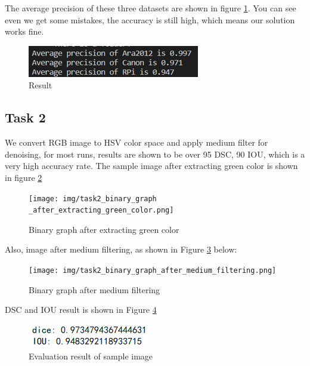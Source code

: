 \documentclass[conference]{IEEEtran}
\begin{document}
The average precision of these three datasets are shown in figure \ref{task1_eva}. You can see even we get some mistakes, the accuracy is still high, which means our solution works fine.


\begin{figure}[h!]
\centering
\includegraphics[width=0.7\linewidth]{img/task1_eva.png}
\caption{Result}
\label{task1_eva}
\end{figure}

\subsection{Task 2}
We convert RGB image to HSV color space and apply medium filter for denoising, for most runs, results are shown to be over 95 DSC, 90 IOU, which is a very high accuracy rate. The sample image after extracting green color is shown in figure \ref{task2_binary_graph_after_extracting_green_color}

\begin{figure}[h!]
\centering
\texttt{[image: img/task2\_binary\_graph \_after\_extracting\_green\_color.png]}
\caption{Binary graph after extracting green color}
\label{task2_binary_graph_after_extracting_green_color}
\end{figure}
Also, image after medium filtering, as shown in Figure \ref{task2_binary_graph_after_medium_filtering} below:

\begin{figure}[h!]
\centering
\texttt{[image: img/task2\_binary\_graph\_after\_medium\_filtering.png]}
\caption{Binary graph after medium filtering}
\label{task2_binary_graph_after_medium_filtering}
\end{figure}
DSC and IOU result is shown in Figure \ref{task2_dice_and_iou}

\begin{figure}[h!]
\centering
\includegraphics[width=0.5\linewidth]{img/task2_dice_and_iou.png}
\caption{Evaluation result of sample image}
\label{task2_dice_and_iou}
\end{figure}
\end{document}

